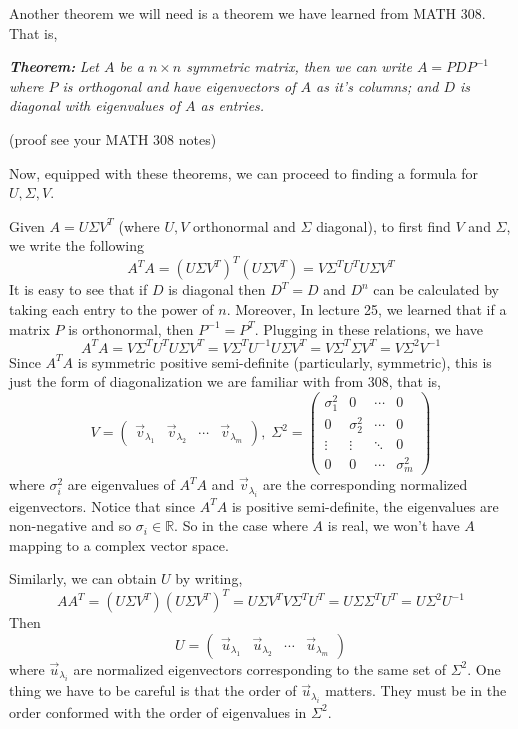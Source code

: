 \documentclass{article}
\begin{document}
Another theorem we will need is a theorem we have learned from MATH 308. That is, 
\bigskip

\textit{\textbf{Theorem:}} \textit{Let $A$ be a $n \times n $ symmetric matrix, then we can write $A= P D P^{-1}$ where $P$ is orthogonal and have eigenvectors of $A$ as it's columns; and $D$ is diagonal with eigenvalues of $A$ as entries.}

(proof see your MATH 308 notes)
\bigskip 

Now, equipped with these theorems, we can proceed to finding a formula for $U, \Sigma, V$. 
\bigskip

Given $A= U \Sigma V^T$ (where $U,V$ orthonormal and $\Sigma$ diagonal), to first find $V$ and $\Sigma$, we write the following 
$$A^TA = ( U \Sigma V^T)^T ( U \Sigma V^T) = V \Sigma^T U^T U \Sigma V^T$$
It is easy to see that if $D$ is diagonal then $D^T = D$ and $D^n$ can be calculated by taking each entry to the power of $n$. Moreover, In lecture 25, we learned that if a matrix $P$ is orthonormal, then $P^{-1} = P^T$. Plugging in these relations, we have 
$$A^TA =V \Sigma^T U^T U \Sigma V^T = V \Sigma^T U^{-1} U \Sigma V^T =V \Sigma^T  \Sigma V^T = V \Sigma^2 V^{-1}$$
Since $A^TA$ is symmetric positive semi-definite (particularly, symmetric), this is just the form of diagonalization we are familiar with from 308, that is, $$V = \begin{pmatrix} \vec{v}_{\lambda_1} & \vec{v}_{\lambda_2} & \cdots & \vec{v}_{\lambda_m} \end{pmatrix}, \; \Sigma^2 = \begin{pmatrix} \sigma^2_1 & 0&  \cdots & 0 \\ 0& \sigma^2_2 &\cdots & 0 \\ \vdots & \vdots & \ddots &0 \\
0 &0& \cdots & \sigma^2_m  \end{pmatrix}$$ 
where $\sigma^2_i$ are eigenvalues of $A^TA$ and $\vec{v}_{\lambda_i}$ are the corresponding normalized eigenvectors. Notice that since $A^TA$ is positive semi-definite, the eigenvalues are non-negative and so $\sigma_i \in \mathbb{R}$. So in the case where $A$ is real, we won't have $A$ mapping to a complex vector space. 
\bigskip

Similarly, we can obtain $U$ by writing,
$$AA^T = (U \Sigma V^T)(U \Sigma V^T)^T = U \Sigma V^T V \Sigma^TU^T = U \Sigma  \Sigma^TU^T = U  \Sigma^2U^{-1}$$
Then 
$$U = \begin{pmatrix} \vec{u}_{\lambda_1} & \vec{u}_{\lambda_2} & \cdots & \vec{u}_{\lambda_m} \end{pmatrix}$$ 
where $\vec{u}_{\lambda_i}$ are normalized eigenvectors corresponding to the same set of $\Sigma^2$. One thing we have to be careful is that the order of $\vec{u}_{\lambda_i}$ matters. They must be in the order conformed with the order of eigenvalues in $\Sigma^2$.
\end{document}
